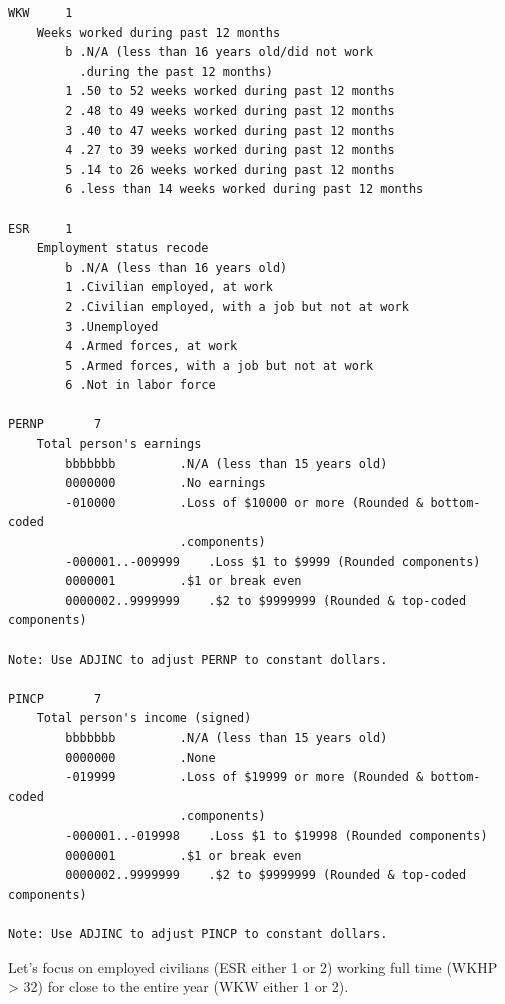 \documentclass[]{book}
\newenvironment{Shaded}{\begin{snugshade}}{\end{snugshade}}
\newcommand{\KeywordTok}[1]{\textcolor[rgb]{0.13,0.29,0.53}{\textbf{{#1}}}}
\newcommand{\DecValTok}[1]{\textcolor[rgb]{0.00,0.00,0.81}{{#1}}}
\newcommand{\StringTok}[1]{\textcolor[rgb]{0.31,0.60,0.02}{{#1}}}
\newcommand{\NormalTok}[1]{{#1}}
\theoremstyle{definition}
\theoremstyle{definition}
\theoremstyle{remark}
\begin{document}
\begin{verbatim}
WKW     1   
    Weeks worked during past 12 months
        b .N/A (less than 16 years old/did not work 
          .during the past 12 months)
        1 .50 to 52 weeks worked during past 12 months
        2 .48 to 49 weeks worked during past 12 months
        3 .40 to 47 weeks worked during past 12 months
        4 .27 to 39 weeks worked during past 12 months
        5 .14 to 26 weeks worked during past 12 months 
        6 .less than 14 weeks worked during past 12 months
        
ESR     1   
    Employment status recode
        b .N/A (less than 16 years old)
        1 .Civilian employed, at work
        2 .Civilian employed, with a job but not at work
        3 .Unemployed
        4 .Armed forces, at work
        5 .Armed forces, with a job but not at work
        6 .Not in labor force
        
PERNP       7   
    Total person's earnings
        bbbbbbb         .N/A (less than 15 years old)
        0000000         .No earnings
        -010000         .Loss of $10000 or more (Rounded & bottom-coded 
                        .components) 
        -000001..-009999    .Loss $1 to $9999 (Rounded components)
        0000001         .$1 or break even
        0000002..9999999    .$2 to $9999999 (Rounded & top-coded components)
        
Note: Use ADJINC to adjust PERNP to constant dollars.

PINCP       7   
    Total person's income (signed)
        bbbbbbb         .N/A (less than 15 years old)
        0000000         .None
        -019999         .Loss of $19999 or more (Rounded & bottom-coded 
                        .components) 
        -000001..-019998    .Loss $1 to $19998 (Rounded components)
        0000001         .$1 or break even
        0000002..9999999    .$2 to $9999999 (Rounded & top-coded components)
            
Note: Use ADJINC to adjust PINCP to constant dollars.
\end{verbatim}

Let's focus on employed civilians (ESR either 1 or 2) working full time
(WKHP \textgreater{} 32) for close to the entire year (WKW either 1 or
2).

\begin{Shaded}
\end{Shaded}
\end{document}
